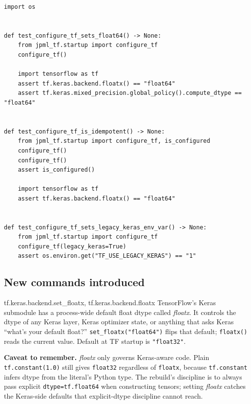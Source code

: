 \documentclass[11pt]{report}
\begin{document}
\begin{lstlisting}[style=python, caption={\texttt{code\_clean/tests/test\_01\_startup.py}}]
import os


def test_configure_tf_sets_float64() -> None:
    from jpml_tf.startup import configure_tf
    configure_tf()

    import tensorflow as tf
    assert tf.keras.backend.floatx() == "float64"
    assert tf.keras.mixed_precision.global_policy().compute_dtype == "float64"


def test_configure_tf_is_idempotent() -> None:
    from jpml_tf.startup import configure_tf, is_configured
    configure_tf()
    configure_tf()
    assert is_configured()

    import tensorflow as tf
    assert tf.keras.backend.floatx() == "float64"


def test_configure_tf_sets_legacy_keras_env_var() -> None:
    from jpml_tf.startup import configure_tf
    configure_tf(legacy_keras=True)
    assert os.environ.get("TF_USE_LEGACY_KERAS") == "1"
\end{lstlisting}

\subsection*{New commands introduced}

\begin{tfcmd}{tf.keras.backend.set\_floatx, tf.keras.backend.floatx}
TensorFlow's Keras submodule has a process-wide default float dtype
called \emph{floatx}. It controls the dtype of any Keras layer, Keras
optimizer state, or anything that asks Keras ``what's your default
float?'' \texttt{set\_floatx("float64")} flips that default;
\texttt{floatx()} reads the current value. Default at TF startup is
\texttt{"float32"}.

\textbf{Caveat to remember.} \emph{floatx} only governs Keras-aware code.
Plain \texttt{tf.constant(1.0)} still gives \texttt{float32} regardless
of \texttt{floatx}, because \texttt{tf.constant} infers dtype from the
literal's Python type. The rebuild's discipline is to always pass
explicit \texttt{dtype=tf.float64} when constructing tensors; setting
\emph{floatx} catches the Keras-side defaults that explicit-dtype
discipline cannot reach.
\end{tfcmd}
\end{document}
